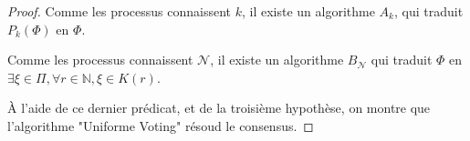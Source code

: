 \documentclass{article}
\begin{document}
\begin{proof}

	Comme les processus connaissent $k$, il existe un algorithme $A_k$, qui traduit $P_k(\Phi)$ en $\Phi$.

	Comme les processus connaissent $\mathcal{N}$, il existe un algorithme $B_\mathcal{N}$ qui traduit $\Phi$ en $\exists \xi \in \Pi, \forall r \in \mathds{N}, \xi \in K(r)$.

	À l'aide de ce dernier prédicat, et de la troisième hypothèse, on montre que l'algorithme "Uniforme Voting" résoud le consensus.
\end{proof}
\end{document}
